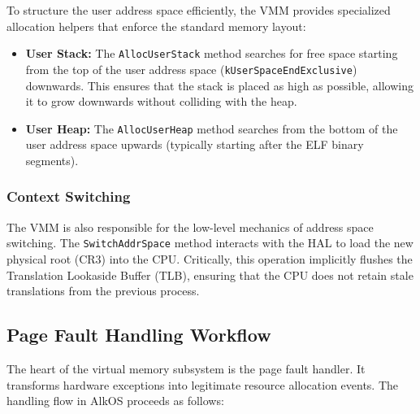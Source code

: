 \documentclass[a4paper,10pt,twoside]{report}
\theoremstyle{definition}
\begin{document}
To structure the user address space efficiently, the VMM provides specialized allocation helpers that enforce the standard memory layout:

\begin{itemize}
    \item \textbf{User Stack:} The \texttt{AllocUserStack} method searches for free space starting from the top of the user address space (\texttt{kUserSpaceEndExclusive}) downwards. This ensures that the stack is placed as high as possible, allowing it to grow downwards without colliding with the heap.
    \item \textbf{User Heap:} The \texttt{AllocUserHeap} method searches from the bottom of the user address space upwards (typically starting after the ELF binary segments).
\end{itemize}

\subsubsection{Context Switching}

The VMM is also responsible for the low-level mechanics of address space switching. The \texttt{SwitchAddrSpace} method interacts with the HAL to load the new physical root (CR3) into the CPU. Critically, this operation implicitly flushes the Translation Lookaside Buffer (TLB), ensuring that the CPU does not retain stale translations from the previous process.

\subsection{Page Fault Handling Workflow}

The heart of the virtual memory subsystem is the page fault handler. It transforms hardware exceptions into legitimate resource allocation events. The handling flow in AlkOS proceeds as follows:
\end{document}
